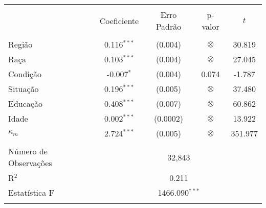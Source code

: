 
\begin{table}[!htbp] \centering 
  \caption{} 
  \label{} 
  \begin{tabular}{@{\extracolsep{5pt}}lcccc} 
  \\[-1.8ex]\hline 
  \hline \\[-1.8ex] 
   & Coeficiente & Erro Padrão & p-valor & \(t\) \\ 
  \hline \\[-1.8ex] 
   Região & 0.116$^{***}$ & (0.004) & \(\otimes\) & 30.819 \\ 
   Raça & 0.103$^{***}$ & (0.004) & \(\otimes\) & 27.045 \\ 
   Condição & -0.007$^{*}$ & (0.004) & 0.074 & -1.787 \\ 
   Situação & 0.196$^{***}$ & (0.005) & \(\otimes\) & 37.480 \\ 
   Educação & 0.408$^{***}$ & (0.007) & \(\otimes\) & 60.862 \\ 
   Idade & 0.002$^{***}$ & (0.0002) & \(\otimes\) & 13.922 \\ 
   \(\kappa_m\) & 2.724$^{***}$ & (0.005) & \(\otimes\) & 351.977 \\ 
  \hline \\[-1.8ex] 
  Número de Observações & \multicolumn{4}{c}{32,843} \\ 
  R$^{2}$ & \multicolumn{4}{c}{0.211} \\ 
  Estatística F & \multicolumn{4}{c}{1466.090$^{***}$} \\ 
  \hline 
  \hline \\[-1.8ex] 
  \end{tabular} 
\end{table}
